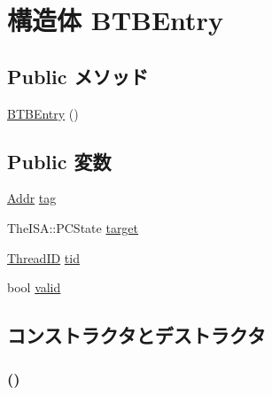 \hypertarget{structDefaultBTB_1_1BTBEntry}{
\section{構造体 BTBEntry}
\label{structDefaultBTB_1_1BTBEntry}
}
\subsection*{Public メソッド}
\begin{DoxyCompactItemize}
\item 
\hyperlink{structDefaultBTB_1_1BTBEntry_abfcdd713838b190e6885a6e3e95e4105}{BTBEntry} ()
\end{DoxyCompactItemize}
\subsection*{Public 変数}
\begin{DoxyCompactItemize}
\item 
\hyperlink{base_2types_8hh_af1bb03d6a4ee096394a6749f0a169232}{Addr} \hyperlink{structDefaultBTB_1_1BTBEntry_a37fe97093e3df5a68f35c18538628836}{tag}
\item 
TheISA::PCState \hyperlink{structDefaultBTB_1_1BTBEntry_a66d4c02793d74240a0ebca6531d38c26}{target}
\item 
\hyperlink{base_2types_8hh_ab39b1a4f9dad884694c7a74ed69e6a6b}{ThreadID} \hyperlink{structDefaultBTB_1_1BTBEntry_aa508770268ee4ceaf16054b9e0be0e17}{tid}
\item 
bool \hyperlink{structDefaultBTB_1_1BTBEntry_a28e3c179a86f337095088b3ca02a2b2a}{valid}
\end{DoxyCompactItemize}


\subsection{コンストラクタとデストラクタ}
\hypertarget{structDefaultBTB_1_1BTBEntry_abfcdd713838b190e6885a6e3e95e4105}{
\subsubsection[{BTBEntry}]{ ()}}
\label{structDefaultBTB_1_1BTBEntry_abfcdd713838b190e6885a6e3e95e4105}



